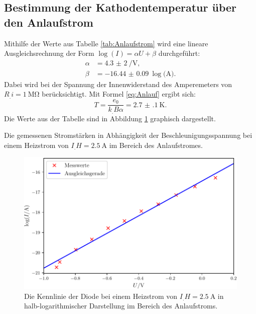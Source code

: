 \subsection{Bestimmung der Kathodentemperatur über den Anlaufstrom}
\label{subsec:Temperatur}

Mithilfe der Werte aus Tabelle \ref{tab:Anlaufstrom} wird eine lineare Ausgleichsrechnung der Form $\log(I)=\alpha U+\beta$ durchgeführt:
\begin{align*}
\alpha &= \SI{4,3(2)}{\per\volt}\text{,}\\
\beta  &= \SI{-16.44(9)}{\log(\ampere)}\text{.}
\end{align*}
Dabei wird bei der Spannung der Innenwiderstand des Amperemeters von $R_.i=\SI{1}{\mega\ohm}$ berücksichtigt. Mit Formel \eqref{eq:Anlauf} ergibt sich:
\[
T = \frac{e_0}{k_.B\alpha} = \SI{2.7(1)}{\kelvin}\text{.}
\]
Die Werte aus der Tabelle sind in Abbildung \ref{fig:Anlaufstrom} graphisch dargestellt.

\begin{table}
\centering
\caption{Die gemessenen Stromstärken in Abhängigkeit der Beschleunigungsspannung bei einem Heizstrom von $I_.H=\SI{2,5}{\ampere}$ im Bereich des Anlaufstromes.}

\label{tab:Anlaufstrom}
\end{table}

\begin{figure}
\centering
\includegraphics[width=\linewidth-70pt,height=\textheight-70pt,keepaspectratio]{content/images/Anlaufstrom.pdf}
\caption{Die Kennlinie der Diode bei einem Heizstrom von $I_.H=\SI{2,5}{\ampere}$ in halb-logarithmischer Darstellung im Bereich des Anlaufstroms.}
\label{fig:Anlaufstrom}
\end{figure}

